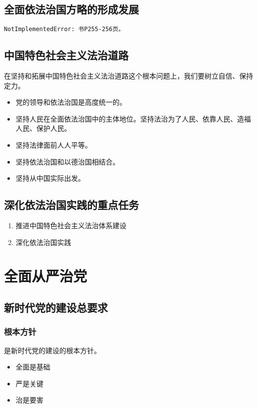     \subsection{全面依法治国方略的形成发展}
        \verb|NotImplementedError: 书P255-256页。|

    \subsection{中国特色社会主义法治道路}
        在坚持和拓展中国特色社会主义法治道路这个根本问题上，我们要树立自信、保持定力。
        \begin{itemize}
            \item {}党的领导和依法治国是高度统一的。
            \item 坚持人民在全面依法治国中的主体地位。坚持法治为了人民、依靠人民、造福人民、保护人民。
            \item 坚持法律面前人人平等。
            \item 坚持依法治国和以德治国相结合。
            \item 坚持从中国实际出发。
        \end{itemize}

    \subsection{深化依法治国实践的重点任务}
        \begin{enumerate}
            \item 推进中国特色社会主义法治体系建设
            \item 深化依法治国实践
        \end{enumerate}


\section{全面从严治党}
    \subsection{新时代党的建设总要求}
        \subsubsection{根本方针}
        是新时代党的建设的根本方针。
        \begin{itemize}
            \item 全面是基础
            \item 严是关键
            \item 治是要害
        \end{itemize}

